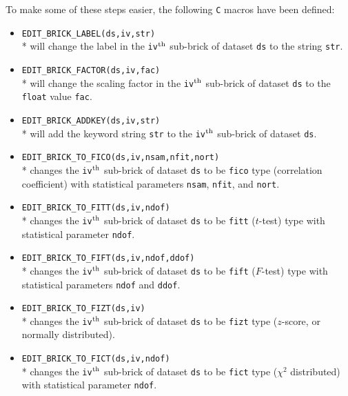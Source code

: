 \noindent
To make some of these steps easier, the following {\tt C} macros
have been defined:
\begin{itemize}
  \item {\tt EDIT\_BRICK\_LABEL(ds,iv,str)} \\*
  will change the label in the
  {\tt iv}$^{\rm th}$ sub-brick of dataset {\tt ds} to the string {\tt str}.

 \item {\tt EDIT\_BRICK\_FACTOR(ds,iv,fac)} \\*
  will change the scaling factor in the
  {\tt iv}$^{\rm th}$ sub-brick of dataset {\tt ds} to the {\tt float} value {\tt fac}.

 \item {\tt EDIT\_BRICK\_ADDKEY(ds,iv,str)} \\*
  will add the keyword string {\tt str} to the
  {\tt iv}$^{\rm th}$ sub-brick of dataset {\tt ds}.

 \item {\tt EDIT\_BRICK\_TO\_FICO(ds,iv,nsam,nfit,nort)} \\*
  changes the {\tt iv}$^{\rm th}$ sub-brick of dataset {\tt ds}
  to be {\tt fico} type (correlation coefficient) with statistical parameters {\tt nsam}, {\tt nfit}, and {\tt nort}.

 \item {\tt EDIT\_BRICK\_TO\_FITT(ds,iv,ndof)} \\*
  changes the {\tt iv}$^{\rm th}$ sub-brick of dataset {\tt ds}
  to be {\tt fitt} ($t$-test) type with statistical parameter {\tt ndof}.

 \item {\tt EDIT\_BRICK\_TO\_FIFT(ds,iv,ndof,ddof)} \\*
  changes the {\tt iv}$^{\rm th}$ sub-brick of dataset {\tt ds}
  to be {\tt fift} ($F$-test) type with statistical parameters {\tt ndof} and {\tt ddof}.

 \item {\tt EDIT\_BRICK\_TO\_FIZT(ds,iv)} \\*
  changes the {\tt iv}$^{\rm th}$ sub-brick of dataset {\tt ds}
  to be {\tt fizt} type ($z$-score, or normally distributed).

 \item {\tt EDIT\_BRICK\_TO\_FICT(ds,iv,ndof)} \\*
  changes the {\tt iv}$^{\rm th}$ sub-brick of dataset {\tt ds}
  to be {\tt fict} type ($\chi^2$ distributed) with statistical parameter {\tt ndof}.


\end{itemize}
